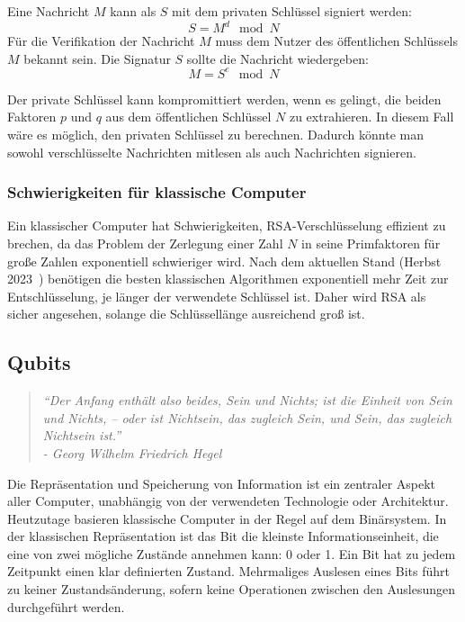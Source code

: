 Eine Nachricht \( M \) kann als \(S\) mit dem privaten Schlüssel signiert werden:
\[
  S = M^d \mod N
\]
Für die Verifikation der Nachricht \(M\) muss dem Nutzer des öffentlichen Schlüssels \(M\) bekannt sein. 
Die Signatur \(S\) sollte die Nachricht wiedergeben:
\[
  M = S^e \mod N
\]

Der private Schlüssel kann kompromittiert werden, wenn es gelingt, die beiden Faktoren \(p\) und 
\(q\) aus dem öffentlichen Schlüssel \(N\) zu extrahieren. 
In diesem Fall wäre es möglich, den privaten Schlüssel zu berechnen. 
Dadurch könnte man sowohl verschlüsselte Nachrichten mitlesen als auch Nachrichten signieren.

\subsubsection*{Schwierigkeiten für klassische Computer}
Ein klassischer Computer hat Schwierigkeiten, 
RSA-Verschlüsselung effizient zu brechen, 
da das Problem der Zerlegung einer Zahl \(N\) in seine Primfaktoren für große Zahlen exponentiell schwieriger wird. 
Nach dem aktuellen Stand (Herbst 2023~\cite{Hoever2022Krypto}) benötigen die besten klassischen Algorithmen exponentiell mehr Zeit zur Entschlüsselung, 
je länger der verwendete Schlüssel ist.
Daher wird RSA als sicher angesehen, solange die Schlüssellänge ausreichend groß ist.



\subsection{Qubits} 
\begin{quote}
  \noindent
  \textit{"`Der Anfang enthält also beides, Sein und
  Nichts; ist die Einheit von Sein und Nichts,
  – oder ist Nichtsein, das zugleich Sein, und
  Sein, das zugleich Nichtsein ist."' \\
  - Georg Wilhelm Friedrich Hegel}
\end{quote}

Die Repräsentation und Speicherung von Information ist ein zentraler Aspekt aller Computer, 
unabhängig von der verwendeten Technologie oder Architektur.
Heutzutage basieren klassische Computer in der Regel auf dem Binärsystem. 
In der klassischen Repräsentation ist das Bit die kleinste Informationseinheit, 
die eine von zwei mögliche Zustände annehmen kann: 0 oder 1. 
Ein Bit hat zu jedem Zeitpunkt einen klar definierten Zustand. 
Mehrmaliges Auslesen eines Bits führt zu keiner Zustandsänderung, 
sofern keine Operationen zwischen den Auslesungen durchgeführt werden.

